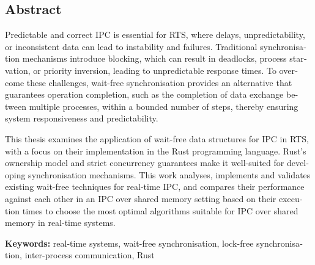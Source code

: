 \begin{otherlanguage}{english}
\chapter*{Abstract}


Predictable and correct \ac{IPC} is essential for \ac{RTS}, where delays, unpredictability, or inconsistent data can lead to instability and failures. Traditional synchronisation mechanisms introduce blocking, which can result in deadlocks, process starvation, or priority inversion, leading to unpredictable response times. To overcome these challenges, wait-free synchronisation provides an alternative that guarantees operation completion, such as the completion of data exchange between multiple processes, within a bounded number of steps, thereby ensuring system responsiveness and predictability.

This thesis examines the application of wait-free data structures for \ac{IPC} in \ac{RTS}, with a focus on their implementation in the Rust programming language. Rust's ownership model and strict concurrency guarantees make it well-suited for developing synchronisation mechanisms. This work analyses, implements and validates existing wait-free techniques for real-time \ac{IPC}, and compares their performance against each other in an \ac{IPC} over shared memory setting based on their execution times to choose the most optimal algorithms suitable for \ac{IPC} over shared memory in real-time systems.

\vfill
\noindent\textbf{Keywords:} real-time systems, wait-free synchronisation, lock-free synchronisation, inter-process communication, Rust
\vfill
\end{otherlanguage}
